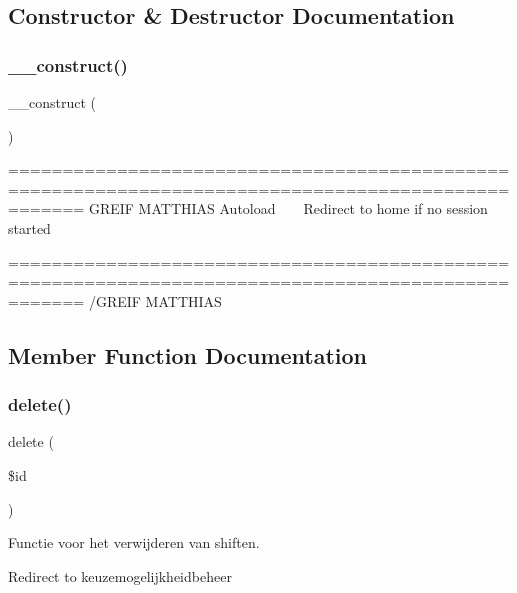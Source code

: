 \subsection{Constructor \& Destructor Documentation}
\mbox{\label{class_shiften_a095c5d389db211932136b53f25f39685}} 
\subsubsection{\texorpdfstring{\+\_\+\+\_\+construct()}{\_\_construct()}}
{\footnotesize\ttfamily \+\_\+\+\_\+construct (\begin{DoxyParamCaption}{ }\end{DoxyParamCaption})}

=================================================================================================== G\+R\+E\+IF M\+A\+T\+T\+H\+I\+AS Autoload ~\newline
~\newline
 Redirect to home if no session started

=================================================================================================== /\+G\+R\+E\+IF M\+A\+T\+T\+H\+I\+AS 

\subsection{Member Function Documentation}
\mbox{\label{class_shiften_a2f8258add505482d7f00ea26493a5723}} 
\subsubsection{\texorpdfstring{delete()}{delete()}}
{\footnotesize\ttfamily delete (\begin{DoxyParamCaption}\item[{}]{\$id }\end{DoxyParamCaption})}



Functie voor het verwijderen van shiften. 

Redirect to keuzemogelijkheidbeheer \mbox{\label{class_shiften_a842e4774e3b3601a005b995c02f7e883}} 
